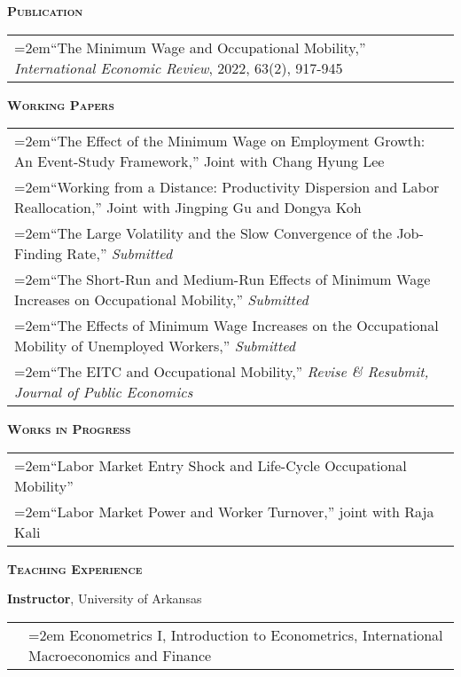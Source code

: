 \documentclass[11pt]{article}
\newenvironment{rSection}[1]{ %
  {\large\bf\textsc{#1}}
  \vspace{0.15cm}
  \begin{list}{}{ %
    \setlength{\leftmargin}{1.5em} %
    \setlength{\rightmargin}{1.5em}
  }
  \item[]
}{
  \end{list}
  \vspace{0.15cm}
}
\begin{document}
\begin{rSection}{Publication}
\begin{tabularx}{\linewidth}{>{\hangindent=2em}X}
``The Minimum Wage and Occupational Mobility,'' \emph{International Economic Review}, 2022, 63(2), 917-945\\
\end{tabularx}
\end{rSection}

\begin{rSection}{Working Papers}
\begin{tabularx}{\linewidth}{>{\hangindent=2em}X}
``The Effect of the Minimum Wage on Employment Growth: An Event-Study Framework,'' Joint with Chang Hyung Lee\\
``Working from a Distance: Productivity Dispersion and Labor Reallocation,'' Joint with Jingping Gu and Dongya Koh\\
``The Large Volatility and the Slow Convergence of the Job-Finding Rate,'' \emph{Submitted}\\
``The Short-Run and Medium-Run Effects of Minimum Wage Increases on Occupational Mobility,'' \emph{Submitted}\\
``The Effects of Minimum Wage Increases on the Occupational Mobility of Unemployed Workers,'' \emph{Submitted}\\
``The EITC and Occupational Mobility,'' \emph{Revise \& Resubmit, Journal of Public Economics}
\end{tabularx}
\end{rSection}

\begin{rSection}{Works in Progress}
\begin{tabularx}{\linewidth}{>{\hangindent=2em}X}
``Labor Market Entry Shock and Life-Cycle Occupational Mobility''\\
``Labor Market Power and Worker Turnover,'' joint with Raja Kali
\end{tabularx}
\end{rSection}

\begin{rSection}{Teaching Experience}
{\bf Instructor}, University of Arkansas\\
\begin{tabularx}{\linewidth}{p{0.3cm} >{\hangindent=2em}X}
& Econometrics I, Introduction to Econometrics, International Macroeconomics and Finance\\[0.3cm]
\end{tabularx}
\end{rSection}
\end{document}

